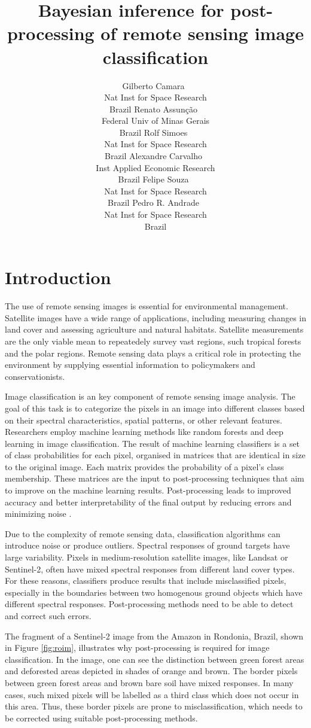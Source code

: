 \documentclass[
  shortnames]{jss}
\author{
Gilberto Camara~\orcidlink{0000-0002-3681-487X}\\Nat Inst for Space Research\\
Brazil \And Renato Assunção~\orcidlink{0000-0001-7442-9166}\\Federal Univ of Minas Gerais\\
Brazil \And Rolf Simoes~\orcidlink{0000-0003-0953-4132}\\Nat Inst for Space Research\\
Brazil \AND Alexandre Carvalho~\orcidlink{0000-0001-8762-5465}\\Inst Applied Economic Research\\
Brazil \And Felipe Souza~\orcidlink{0000-XXXXX}\\Nat Inst for Space Research\\
Brazil \And Pedro R. Andrade~\orcidlink{0000-0001-8675-4046}\\Nat Inst for Space Research\\
Brazil
}
\title{Bayesian inference for post-processing of remote sensing image classification}
\begin{document}
\newpage

\hypertarget{introduction}{%
\section{Introduction}\label{introduction}}

The use of remote sensing images is essential for environmental management. Satellite images have a wide range of applications, including measuring changes in land cover and assessing agriculture and natural habitats. Satellite measurements are the only viable mean to repeatedely survey vast regions, such tropical forests and the polar regions. Remote sensing data plays a critical role in protecting the environment by supplying essential information to policymakers and conservationists.

Image classification is an key component of remote sensing image analysis. The goal of this task is to categorize the pixels in an image into different classes based on their spectral characteristics, spatial patterns, or other relevant features. Researchers employ machine learning methods like random forests \citep{Belgiu2016} and deep learning \citep{Ma2019} in image classification. The result of machine learning classifiers is a set of class probabilities for each pixel, organised in matrices that are identical in size to the original image. Each matrix provides the probability of a pixel's class membership. These matrices are the input to post-processing techniques that aim to improve on the machine learning results. Post-processing leads to improved accuracy and better interpretability of the final output by reducing errors and minimizing noise \citep{Schindler2012}.

Due to the complexity of remote sensing data, classification algorithms can introduce noise or produce outliers. Spectral responses of ground targets have large variability. Pixels in medium-resolution satellite images, like Landsat or Sentinel-2, often have mixed spectral responses from different land cover types. For these reasons, classifiers produce results that include misclassified pixels, especially in the boundaries between two homogenous ground objects which have different spectral responses. Post-processing methods need to be able to detect and correct such errors.

The fragment of a Sentinel-2 image from the Amazon in Rondonia, Brazil, shown in Figure \ref{fig:roim}, illustrates why post-processing is required for image classification. In the image, one can see the distinction between green forest areas and deforested areas depicted in shades of orange and brown. The border pixels between green forest areas and brown bare soil have mixed responses. In many cases, such mixed pixels will be labelled as a third class which does not occur in this area. Thus, these border pixels are prone to misclassification, which needs to be corrected using suitable post-processing methods.
\end{document}
